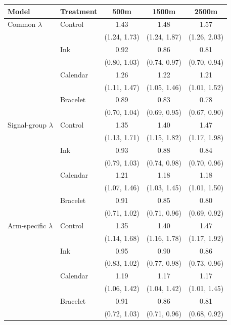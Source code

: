 \begin{tabular}{llccc}
\toprule
Model & Treatment & 500m & 1500m & 2500m \\
\midrule
Common $\lambda$ & Control & 1.43 & 1.48 & 1.57 \\
 &  & (1.24, 1.73) & (1.24, 1.87) & (1.26, 2.03) \\
 & Ink & 0.92 & 0.86 & 0.81 \\
 &  & (0.80, 1.03) & (0.74, 0.97) & (0.70, 0.94) \\
 & Calendar & 1.26 & 1.22 & 1.21 \\
 &  & (1.11, 1.47) & (1.05, 1.46) & (1.01, 1.52) \\
 & Bracelet & 0.89 & 0.83 & 0.78 \\
 &  & (0.70, 1.04) & (0.69, 0.95) & (0.67, 0.90) \\
\midrule
Signal-group $\lambda$ & Control & 1.35 & 1.40 & 1.47 \\
 &  & (1.13, 1.71) & (1.15, 1.82) & (1.17, 1.98) \\
 & Ink & 0.93 & 0.88 & 0.84 \\
 &  & (0.79, 1.03) & (0.74, 0.98) & (0.70, 0.96) \\
 & Calendar & 1.21 & 1.18 & 1.18 \\
 &  & (1.07, 1.46) & (1.03, 1.45) & (1.01, 1.50) \\
 & Bracelet & 0.91 & 0.85 & 0.80 \\
 &  & (0.71, 1.02) & (0.71, 0.96) & (0.69, 0.92) \\
\midrule
Arm-specific $\lambda$ & Control & 1.35 & 1.40 & 1.47 \\
 &  & (1.14, 1.68) & (1.16, 1.78) & (1.17, 1.92) \\
 & Ink & 0.95 & 0.90 & 0.86 \\
 &  & (0.83, 1.02) & (0.77, 0.98) & (0.73, 0.96) \\
 & Calendar & 1.19 & 1.17 & 1.17 \\
 &  & (1.06, 1.42) & (1.04, 1.42) & (1.01, 1.45) \\
 & Bracelet & 0.91 & 0.86 & 0.81 \\
 &  & (0.72, 1.03) & (0.71, 0.96) & (0.68, 0.92) \\
\bottomrule
\end{tabular}
